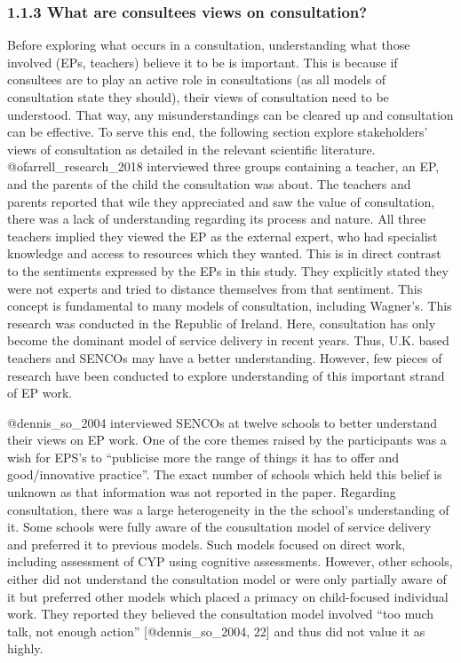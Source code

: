 \documentclass[
]{article}
\begin{document}
\hypertarget{what-are-consultees-views-on-consultation}{%
\subsubsection{1.1.3 What are consultees views on
consultation?}\label{what-are-consultees-views-on-consultation}}

Before exploring what occurs in a consultation, understanding what those
involved (EPs, teachers) believe it to be is important. This is because
if consultees are to play an active role in consultations (as all models
of consultation state they should), their views of consultation need to
be understood. That way, any misunderstandings can be cleared up and
consultation can be effective. To serve this end, the following section
explore stakeholders' views of consultation as detailed in the relevant
scientific literature. @ofarrell\_research\_2018 interviewed three
groups containing a teacher, an EP, and the parents of the child the
consultation was about. The teachers and parents reported that wile they
appreciated and saw the value of consultation, there was a lack of
understanding regarding its process and nature. All three teachers
implied they viewed the EP as the external expert, who had specialist
knowledge and access to resources which they wanted. This is in direct
contrast to the sentiments expressed by the EPs in this study. They
explicitly stated they were not experts and tried to distance themselves
from that sentiment. This concept is fundamental to many models of
consultation, including Wagner's. This research was conducted in the
Republic of Ireland. Here, consultation has only become the dominant
model of service delivery in recent years. Thus, U.K. based teachers and
SENCOs may have a better understanding. However, few pieces of research
have been conducted to explore understanding of this important strand of
EP work.

@dennis\_so\_2004 interviewed SENCOs at twelve schools to better
understand their views on EP work. One of the core themes raised by the
participants was a wish for EPS's to ``publicise more the range of
things it has to offer and good/innovative practice''. The exact number
of schools which held this belief is unknown as that information was not
reported in the paper. Regarding consultation, there was a large
heterogeneity in the the school's understanding of it. Some schools were
fully aware of the consultation model of service delivery and preferred
it to previous models. Such models focused on direct work, including
assessment of CYP using cognitive assessments. However, other schools,
either did not understand the consultation model or were only partially
aware of it but preferred other models which placed a primacy on
child-focused individual work. They reported they believed the
consultation model involved ``too much talk, not enough action''
{[}@dennis\_so\_2004, 22{]} and thus did not value it as highly.
\end{document}
